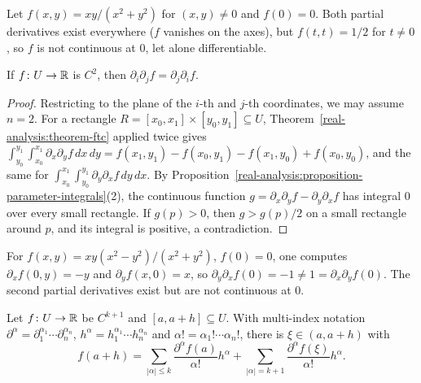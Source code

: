 \begin{counterexample}\label{real-analysis:counterexample-partials}
Let $f(x, y) = xy/(x^2 + y^2)$ for $(x, y) \neq 0$ and $f(0) = 0$. Both partial derivatives exist everywhere ($f$ vanishes on the axes), but $f(t, t) = 1/2$ for $t \neq 0$, so $f$ is not continuous at $0$, let
alone differentiable.
\end{counterexample}

\begin{theorem}[Schwarz]\label{real-analysis:theorem-schwarz}
If $f \colon U \to \mathbb{R}$ is $C^2$, then $\partial_i\partial_jf = \partial_j\partial_if$.
\end{theorem}

\begin{proof}
Restricting to the plane of the $i$-th and $j$-th coordinates, we may assume $n = 2$. For a rectangle $R = [x_0, x_1] \times [y_0, y_1] \subseteq U$, Theorem~\ref{real-analysis:theorem-ftc} applied twice gives
$\int_{y_0}^{y_1}\int_{x_0}^{x_1}\partial_x\partial_yf\,dx\,dy = f(x_1, y_1) - f(x_0, y_1) - f(x_1, y_0) + f(x_0, y_0)$, and the same for $\int_{x_0}^{x_1}\int_{y_0}^{y_1}\partial_y\partial_xf\,dy\,dx$. By
Proposition~\ref{real-analysis:proposition-parameter-integrals}(2), the continuous function $g = \partial_x\partial_yf - \partial_y\partial_xf$ has integral $0$ over every small rectangle. If $g(p) > 0$, then $g > g(p)/2$ on a small
rectangle around $p$, and its integral is positive, a contradiction.
\end{proof}

\begin{counterexample}\label{real-analysis:counterexample-schwarz}
For $f(x, y) = xy(x^2 - y^2)/(x^2 + y^2)$, $f(0) = 0$, one computes $\partial_xf(0, y) = -y$ and $\partial_yf(x, 0) = x$, so $\partial_y\partial_xf(0) = -1 \neq 1 = \partial_x\partial_yf(0)$. The second partial derivatives
exist but are not continuous at $0$.
\end{counterexample}

\begin{theorem}\label{real-analysis:theorem-taylor-several}
Let $f \colon U \to \mathbb{R}$ be $C^{k+1}$ and $[a, a + h] \subseteq U$. With multi-index notation $\partial^\alpha = \partial_1^{\alpha_1} \cdots \partial_n^{\alpha_n}$, $h^\alpha = h_1^{\alpha_1} \cdots h_n^{\alpha_n}$ and
$\alpha! = \alpha_1! \cdots \alpha_n!$, there is $\xi \in (a, a + h)$ with
\[
f(a + h) = \sum_{|\alpha| \leq k}\frac{\partial^\alpha f(a)}{\alpha!}h^\alpha + \sum_{|\alpha| = k+1}\frac{\partial^\alpha f(\xi)}{\alpha!}h^\alpha.
\]
\end{theorem}

